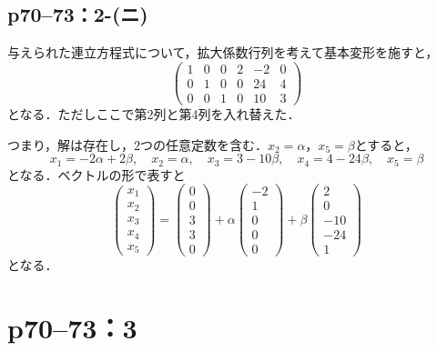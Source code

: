 \documentclass[a4paper,10pt,fleqn]{ltjsarticle}
\begin{document}
\subsection*{p70--73：2-(ニ)}

\begin{tleftbar}
  与えられた連立方程式について，拡大係数行列を考えて基本変形を施すと，
  \[
    \begin{pmatrix} 1 & 0 & 0  & 2 & -2 & 0  \\ 0 & 1& 0  & 0 & 24 & 4 \\ 0 & 0 & 1 & 0 & 10 & 3 \end{pmatrix}
  \]
  となる．ただしここで第2列と第4列を入れ替えた．

  つまり，解は存在し，$2$つの任意定数を含む．$x_2 = \alpha$，$x_5 = \beta$とすると，
  \[
    x_1 = -2\alpha + 2\beta  , \quad x_2 =\alpha  , \quad x_3 = 3 -10\beta  , \quad x_4 = 4 -24 \beta ,\quad x_5 =\beta
  \]
  となる．ベクトルの形で表すと
  \[
    \begin{pmatrix} x_1 \\ x_2 \\ x_3 \\ x_4 \\ x_5 \end{pmatrix}= \begin{pmatrix} 0 \\ 0 \\ 3 \\ 3 \\ 0 \end{pmatrix} +\alpha \begin{pmatrix} -2 \\ 1\\ 0 \\ 0 \\ 0 \end{pmatrix} + \beta \begin{pmatrix} 2 \\ 0 \\ -10 \\ -24 \\ 1 \end{pmatrix}
  \]
  となる．
\end{tleftbar}


\newpage

\section*{p70--73：3}
\end{document}
